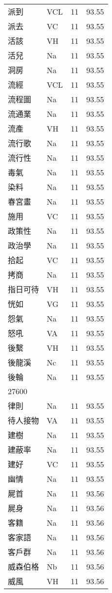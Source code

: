 \documentclass[twocolumn]{book}
\begin{document}
\begin{supertabular}{llrr}
派到 & VCL & 11 &  93.55\\
派去 & VC & 11 &  93.55\\
活該 & VH & 11 &  93.55\\
活兒 & Na & 11 &  93.55\\
洞房 & Na & 11 &  93.55\\
流經 & VCL & 11 &  93.55\\
流程圖 & Na & 11 &  93.55\\
流通業 & Na & 11 &  93.55\\
流產 & VH & 11 &  93.55\\
流行歌 & Na & 11 &  93.55\\
流行性 & Na & 11 &  93.55\\
毒氣 & Na & 11 &  93.55\\
染料 & Na & 11 &  93.55\\
春宮畫 & Na & 11 &  93.55\\
施用 & VC & 11 &  93.55\\
政策性 & Na & 11 &  93.55\\
政治學 & Na & 11 &  93.55\\
拾起 & VC & 11 &  93.55\\
拷商 & Na & 11 &  93.55\\
指日可待 & VH & 11 &  93.55\\
恍如 & VG & 11 &  93.55\\
怨氣 & Na & 11 &  93.55\\
怒吼 & VA & 11 &  93.55\\
後繫 & VH & 11 &  93.55\\
後龍溪 & Nc & 11 &  93.55\\
後輪 & Na & 11 &  93.55\\
27600\\
律則 & Na & 11 &  93.55\\
待人接物 & VA & 11 &  93.55\\
建樹 & Na & 11 &  93.55\\
建蔽率 & Na & 11 &  93.55\\
建好 & VC & 11 &  93.55\\
幽情 & Na & 11 &  93.55\\
屍首 & Na & 11 &  93.56\\
屍身 & Na & 11 &  93.56\\
客籍 & Na & 11 &  93.56\\
客家語 & Na & 11 &  93.56\\
客戶群 & Na & 11 &  93.56\\
威森伯格 & Nb & 11 &  93.56\\
威風 & VH & 11 &  93.56\\

\end{supertabular}
\end{document}
